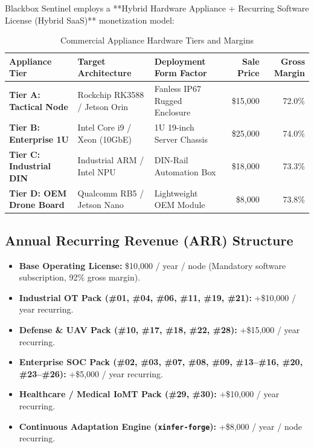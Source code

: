 \documentclass[11pt,a4paper]{article}
\begin{document}
Blackbox Sentinel employs a **Hybrid Hardware Appliance + Recurring Software License (Hybrid SaaS)** monetization model:

\begin{table}[h]
\centering
\small
\caption{Commercial Appliance Hardware Tiers and Margins}
\label{tab:tiers}
\vspace{0.2cm}
\begin{tabularx}{\textwidth}{lXXrr}
\toprule
\textbf{Appliance Tier} & \textbf{Target Architecture} & \textbf{Deployment Form Factor} & \textbf{Sale Price} & \textbf{Gross Margin} \\ \midrule
\textbf{Tier A: Tactical Node} & Rockchip RK3588 / Jetson Orin & Fanless IP67 Rugged Enclosure & \$15,000 & 72.0\% \\
\textbf{Tier B: Enterprise 1U} & Intel Core i9 / Xeon (10GbE) & 1U 19-inch Server Chassis & \$25,000 & 74.0\% \\
\textbf{Tier C: Industrial DIN} & Industrial ARM / Intel NPU & DIN-Rail Automation Box & \$18,000 & 73.3\% \\
\textbf{Tier D: OEM Drone Board} & Qualcomm RB5 / Jetson Nano & Lightweight OEM Module & \$8,000 & 73.8\% \\ \bottomrule
\end{tabularx}
\end{table}

\subsection{Annual Recurring Revenue (ARR) Structure}
\begin{itemize}
    \item \textbf{Base Operating License:} \$10,000 / year / node (Mandatory software subscription, 92\% gross margin).
    \item \textbf{Industrial OT Pack (\#01, \#04, \#06, \#11, \#19, \#21):} +\$10,000 / year recurring.
    \item \textbf{Defense \& UAV Pack (\#10, \#17, \#18, \#22, \#28):} +\$15,000 / year recurring.
    \item \textbf{Enterprise SOC Pack (\#02, \#03, \#07, \#08, \#09, \#13--\#16, \#20, \#23--\#26):} +\$5,000 / year recurring.
    \item \textbf{Healthcare / Medical IoMT Pack (\#29, \#30):} +\$10,000 / year recurring.
    \item \textbf{Continuous Adaptation Engine (\texttt{xinfer-forge}):} +\$8,000 / year / node recurring.
\end{itemize}
\end{document}
